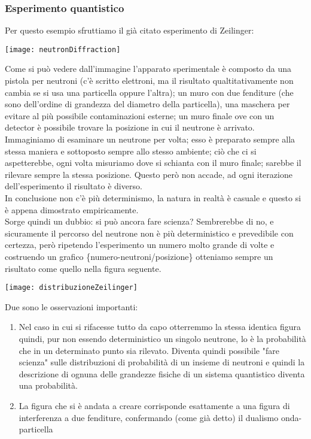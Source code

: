 \subsubsection{Esperimento quantistico}
Per questo esempio sfruttiamo il già citato esperimento di Zeilinger:
\begin{center}
\texttt{[image: neutronDiffraction]}
\end{center}
Come si può vedere dall'immagine l'apparato sperimentale è composto da una pistola per neutroni (c'è scritto elettroni, ma il risultato qualtitativamente non cambia se si usa una particella oppure l'altra); un muro con due fenditure (che sono dell'ordine di grandezza del diametro della particella), una maschera per evitare al più possibile contaminazioni esterne; un muro finale ove con un detector è possibile trovare la posizione in cui il neutrone è arrivato.
Immaginiamo di esaminare un neutrone per volta; esso è preparato sempre alla stessa maniera e sottoposto sempre allo stesso ambiente; ciò che ci si aspetterebbe, ogni volta misuriamo dove si schianta con il muro finale; sarebbe il rilevare sempre la stessa posizione. Questo però non accade, ad ogni iterazione dell'esperimento il risultato è diverso.\\
In conclusione non c'è più determinismo, la natura in realtà è casuale e questo si è appena dimostrato empiricamente.\\
Sorge quindi un dubbio: si può ancora fare scienza? Sembrerebbe di no, e sicuramente il percorso del neutrone non è più deterministico e prevedibile con certezza, però ripetendo l'esperimento un numero molto grande di volte e costruendo un grafico \{numero-neutroni/posizione\} otteniamo sempre un risultato come quello nella figura seguente.
\begin{center} 
\texttt{[image: distribuzioneZeilinger]} \end{center}
Due sono le osservazioni importanti:
\begin{enumerate}
\item Nel caso in cui si rifacesse tutto da capo otterremmo la stessa identica figura quindi, pur non essendo deterministico un singolo neutrone, lo è la probabilità che in un determinato punto sia rilevato. Diventa quindi possibile "fare scienza" sulle distribuzioni di probabilità di un insieme di neutroni e quindi la descrizione di ognuna delle grandezze fisiche di un sistema quantistico diventa una probabilità.
\item La figura che si è andata a creare corrisponde esattamente a una figura di interferenza a due fenditure, confermando (come già detto) il dualismo onda-particella
\end{enumerate}
